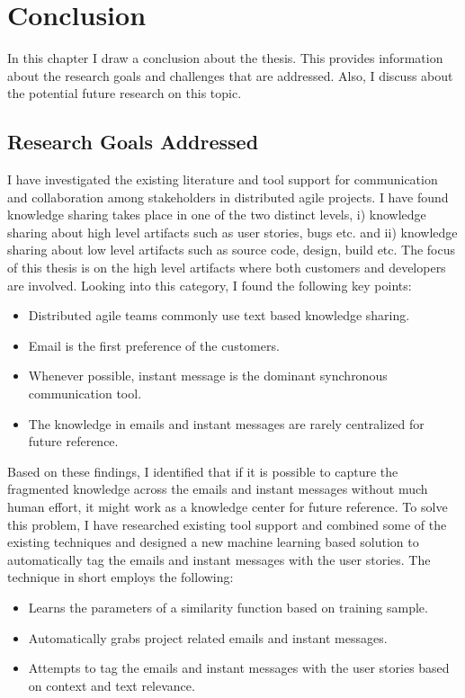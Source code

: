 \fancyhead[RO,LE]{\thepage}
\fancyfoot{} 
\chapter{Conclusion} 
\label{ch:conclusion}
In this chapter I draw a conclusion about the thesis. This provides information about the research goals and challenges that are addressed. Also, I discuss about the potential future research on this topic.

\section{Research Goals Addressed}
I have investigated the existing literature and tool support for communication and collaboration among stakeholders in distributed agile projects. I have found knowledge sharing takes place in one of the two distinct levels, i) knowledge sharing about high level artifacts such as user stories, bugs etc. and ii) knowledge sharing about low level artifacts such as source code, design, build etc. The focus of this thesis is on the high level artifacts where both customers and developers are involved. Looking into this category, I found the following key points:
\begin{itemize}
	\item Distributed agile teams commonly use text based knowledge sharing.
	\item Email is the first preference of the customers.
	\item Whenever possible, instant message is the dominant synchronous communication tool.	
	\item The knowledge in emails and instant messages are rarely centralized for future reference.
\end{itemize}

Based on these findings, I identified that if it is possible to capture the fragmented knowledge across the emails and instant messages without much human effort, it might work as a knowledge center for future reference. To solve this problem, I have researched existing tool support and combined some of the existing techniques and designed a new machine learning based solution to automatically tag the emails and instant messages with the user stories. The technique in short employs the following:
\begin{itemize}
	\item Learns the parameters of a similarity function based on training sample.
	\item Automatically grabs project related emails and instant messages.
	\item Attempts to tag the emails and instant messages with the user stories based on context and text relevance.
\end{itemize}

